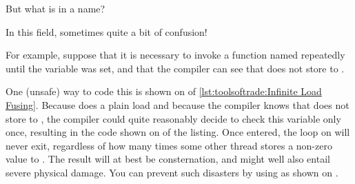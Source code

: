 \begin{description}[labelsep=.4em]
{	But what is in a name?

	In this field, sometimes quite a bit of confusion!
}\QuickQuizEnd

For example, suppose that it is necessary to invoke a function
named  repeatedly until the variable
 was set, and that the compiler can see that
 does not store to .
\begin{fcvref}
One (unsafe) way to code this is shown on  of
\cref{lst:toolsoftrade:Infinite Load Fusing}.
Because  does a plain load and because the compiler knows that
 does not store to , the
compiler could quite reasonably decide to check this variable only once,
resulting in the code shown on  of the listing.
Once entered, the loop on 
will never exit, regardless of how
many times some other thread stores a non-zero value to .
The result will at best be consternation, and might well also entail
severe physical damage.
You can prevent such disasters by using  as shown
on .
\end{fcvref}


\end{description}
